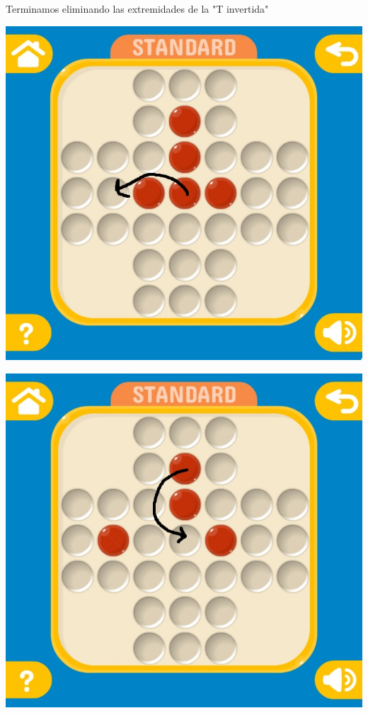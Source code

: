 \documentclass[10pt,a4paper]{report}
\begin{document}
Terminamos eliminando las extremidades de la "T invertida"

\begin{center}
	\includegraphics[scale=.3]{17.jpg} \hspace{6cm}
	
	\includegraphics[scale=.3]{18.jpg} \hspace{6cm}
	

\end{center}
\end{document}
